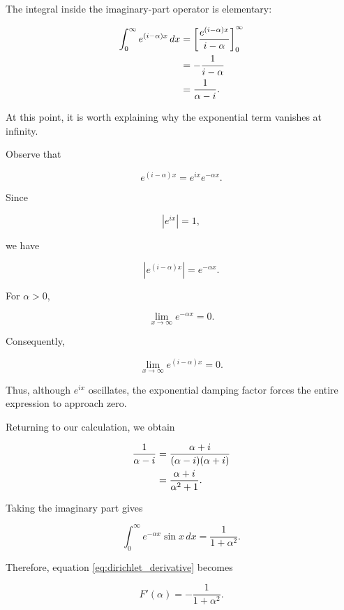 \documentclass[11pt,a4paper]{article}
\theoremstyle{definition}
\theoremstyle{remark}
\begin{document}
The integral inside the
imaginary-part operator is
elementary:

\begin{align}
    \int_0^\infty
    e^{(i-\alpha)x}\,dx
    &=
    \left[
    \frac{e^{(i-\alpha)x}}{i-\alpha}
    \right]_0^\infty
    \notag\\
    &=
    -\frac{1}{i-\alpha}
    \notag\\
    &=
    \frac{1}{\alpha-i}.
\end{align}

At this point, it is worth
explaining why the exponential
term vanishes at infinity.

Observe that

\[
    e^{(i-\alpha)x}
    =
    e^{ix}e^{-\alpha x}.
\]

Since

\[
    |e^{ix}|=1,
\]

we have

\begin{equation}
    |e^{(i-\alpha)x}|
    =
    e^{-\alpha x}.
\end{equation}

For $\alpha>0$,

\[
    \lim_{x\to\infty}
    e^{-\alpha x}=0.
\]

Consequently,

\begin{equation}
    \lim_{x\to\infty}
    e^{(i-\alpha)x}=0.
\end{equation}

Thus, although $e^{ix}$ oscillates,
the exponential damping factor
forces the entire expression
to approach zero.

Returning to our calculation,
we obtain

\begin{align}
    \frac{1}{\alpha-i}
    &=
    \frac{\alpha+i}
         {(\alpha-i)(\alpha+i)}
    \notag\\
    &=
    \frac{\alpha+i}{\alpha^2+1}.
\end{align}

Taking the imaginary part gives

\begin{equation}
    \int_0^\infty
    e^{-\alpha x}\sin x\,dx
    =
    \frac{1}{1+\alpha^2}.
\end{equation}

Therefore, equation
\eqref{eq:dirichlet_derivative}
becomes

\begin{equation}
    \boxed{
    F'(\alpha)
    =
    -\frac{1}{1+\alpha^2}.
    }
    \label{eq:dirichlet_differential}
\end{equation}
\end{document}
